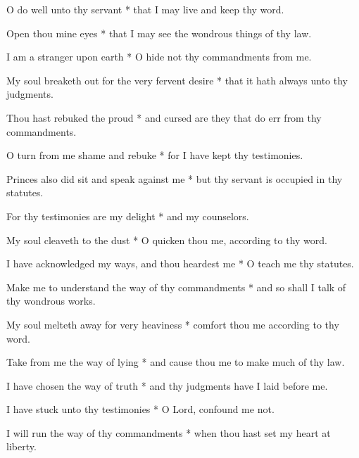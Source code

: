 O do well unto thy servant * that I may live and keep thy word.

Open thou mine eyes * that I may see the wondrous things of thy law.

I am a stranger upon earth * O hide not thy commandments from me.

My soul breaketh out for the very fervent desire * that it hath always unto thy judgments.

Thou hast rebuked the proud * and cursed are they that do err from thy commandments.

O turn from me shame and rebuke * for I have kept thy testimonies.

Princes also did sit and speak against me * but thy servant is occupied in thy statutes.

For thy testimonies are my delight * and my counselors.

My soul cleaveth to the dust * O quicken thou me, according to thy word.

I have acknowledged my ways, and thou heardest me * O teach me thy statutes.

Make me to understand the way of thy commandments * and so shall I talk of thy wondrous works.

My soul melteth away for very heaviness * comfort thou me according to thy word.

Take from me the way of lying * and cause thou me to make much of thy law.

I have chosen the way of truth * and thy judgments have I laid before me.

I have stuck unto thy testimonies * O Lord, confound me not.

I will run the way of thy commandments * when thou hast set my heart at liberty.